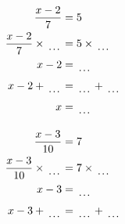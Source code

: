 \documentclass[12pt]{article}
\newcounter{minipagecount}
\begin{document}
\begin{multicols}{2}
\begin{minipage}[t]{0.45\textwidth}
    \raggedright %
    \begin{align*} %
        \frac{x - 2}{7} &= 5\\
        \frac{x - 2}{7} \times\dotuline{\hspace{5mm}} &= 5 \times\dotuline{\hspace{5mm}}\\
        x - 2 &= \dotuline{\hspace{5mm}}\\
        x - 2 + \dotuline{\hspace{5mm}} &= \dotuline{\hspace{5mm}} + \dotuline{\hspace{5mm}}\\
        x &= \dotuline{\hspace{5mm}}\\
    \end{align*}
\end{minipage} %
\noindent{(\theminipagecount)}\hspace{0.1mm} %
\begin{minipage}[t]{0.45\textwidth} %
    \vspace{-26pt}  %
    \raggedright %
    \begin{align*} %
        \frac{x - 3}{10} &= 7\\
        \frac{x - 3}{10} \times\dotuline{\hspace{5mm}} &= 7 \times\dotuline{\hspace{5mm}}\\
        x - 3 &= \dotuline{\hspace{5mm}}\\
        x - 3 + \dotuline{\hspace{5mm}} &= \dotuline{\hspace{5mm}} + \dotuline{\hspace{5mm}}\\

\end{align*}
\end{minipage}
\end{multicols}
\end{document}
